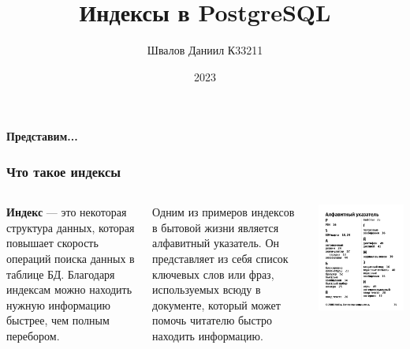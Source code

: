 \documentclass[aspectratio=169]{beamer}
\title{
  \huge{
    Индексы в PostgreSQL
  }
}
\author{Швалов Даниил К33211}
\institute{Университет ИТМО}
\date{2023}
\begin{document}
\def\labelitemi{---}

\frame{\titlepage}

\begin{frame}
  \begin{center}
    {\huge \textbf{Представим...}}
  \end{center}
\end{frame}

\begin{frame}
  \frametitle{Что такое индексы}

  \begin{columns}[onlytextwidth,c]

    \textbf{Индекс} --- это некоторая структура данных, которая повышает
    скорость операций поиска данных в таблице БД. Благодаря индексам можно
    находить нужную информацию быстрее, чем полным перебором.

    \vspace*{1em}

    Одним из примеров индексов в бытовой жизни является алфавитный указатель. Он
    представляет из себя список ключевых слов или фраз, используемых всюду в
    документе, который может помочь читателю быстро находить информацию.


    \includegraphics[width=\textwidth]{images/alphabetical-index.png}
  \end{columns}
\end{frame}
\end{document}
